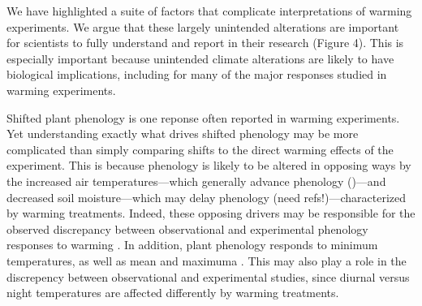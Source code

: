 \documentclass{article}
\begin{document}

\par We have highlighted a suite of factors that complicate interpretations of warming experiments. We argue that these largely unintended alterations are important for scientists to fully understand and report in their research (Figure 4). This is especially important because unintended climate alterations are likely to have biological implications, including for many of the major responses studied in warming experiments.

\par Shifted plant phenology is one reponse often reported in warming experiments. Yet understanding exactly what drives shifted phenology may be more complicated than simply comparing shifts to the direct warming effects of the experiment. This is because phenology is likely to be altered in opposing ways by the increased air temperatures---which generally advance phenology ()---and decreased soil moisture---which may delay phenology (need refs!)---characterized by warming treatments. Indeed, these opposing drivers may be responsible for the observed discrepancy between observational and experimental phenology responses to warming \citep{wolkovich2012}. In addition, plant phenology responds to minimum temperatures, as well as mean and maximuma \citep{shen2016,fu2016,piao2015}. This may also play a role in the discrepency between observational and experimental studies, since diurnal versus night temperatures are affected differently by warming treatments\citep{shen2016,matthews2016}. %
\end{document}
